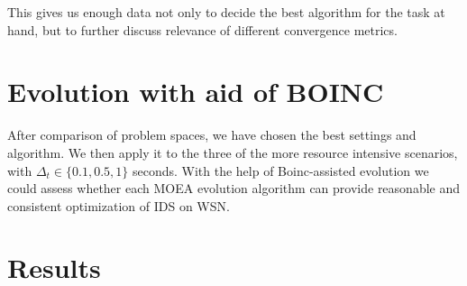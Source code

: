 \documentclass[12pt,oneside]{fithesis2}
\begin{document}
This gives us enough data not only to decide the best algorithm for the task at hand, but to further discuss relevance of different convergence metrics.

\section{Evolution with aid of BOINC}

After comparison of problem spaces, we have chosen the best settings and algorithm. We then apply it to the three of the more resource intensive scenarios, with $\Delta_t \in \{0.1,0.5,1\}$ seconds. With the help of Boinc-assisted evolution we could assess whether each MOEA evolution algorithm can provide reasonable and consistent optimization of IDS on WSN.

\section{Results}





\end{document}
